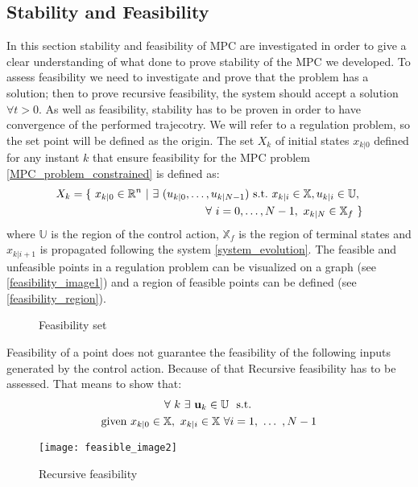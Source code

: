 \subsection{Stability and Feasibility}
In this section stability and feasibility of MPC are investigated in order to give a clear understanding of what done to prove stability of the MPC we developed. To assess feasibility we need to investigate and prove that the problem has a solution; then to prove recursive feasibility, the system should accept a solution $\forall t>0$. As well as feasibility, stability has to be proven in order to have convergence of the performed trajecotry. We will refer to a regulation problem, so the set point will be defined as the origin.
The set $X_{k}$ of initial states $x_{k|0}$ defined for any instant $k$ that ensure feasibility for the MPC problem \ref{MPC_problem_constrained} is defined as:
\begin{equation}
	\begin{split}
		X_{k}=\lbrace\ x_{k|0}\in\mathbb{R}^n\ |\ \exists\  (u_{k|0}, \dots , u_{k|N-1})\ \textnormal{s.t.}\ x_{k|i} \in \mathbb{X}, u_{k|i} \in \mathbb{U},\ &  \\ 
		\forall\  i=0,\dots,N-1,\ x_{k|N} \in \mathbb{X}_f\ \rbrace& \\ 
	\end{split}
\end{equation}
where $\mathbb{U}$ is the region of the control action, $\mathbb{X}_f$ is the region of terminal states and $x_{k|i+1}$ is propagated following the system \ref{system_evolution}. The feasible and unfeasible points in a regulation problem can be visualized on a graph (see \ref{feasibility_image1}) and a region of feasible points can be defined (see \ref{feasibility_region}).

\begin{figure}%
\centering
{}%
\qquad
{}%
\caption{Feasibility set}
\end{figure}

Feasibility of a point does not guarantee the feasibility of the following inputs generated by the control action. Because of that Recursive feasibility has to be assessed. That means to show that:
\begin{equation}
\begin{split}
&\ \ \ \ \ \ \ \ \ \forall\ k\ \exists\  \textbf{u}_k\in \mathbb{U}\ \  \textnormal{s.t. } \\ 
\textnormal{given } &x_{k|0} \in \mathbb{X}, \  x_{k|i} \in \mathbb{X}\  \forall i = 1,\  \dots\ , N-1   
\end{split}
\end{equation}
\begin{figure}[h!]
	\centering
	\texttt{[image: feasible\_image2]}
	\caption{Recursive feasibility}
	\label{feasible_image2}
\end{figure}

